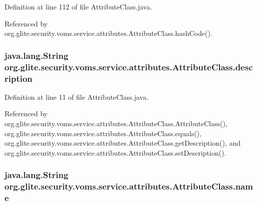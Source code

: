Definition at line 112 of file AttributeClass.java.



Referenced by org.glite.security.voms.service.attributes.AttributeClass.hashCode().

\hypertarget{classorg_1_1glite_1_1security_1_1voms_1_1service_1_1attributes_1_1AttributeClass_a801f19a4afcc37f43430a6e4f56e8cff}{
\subsubsection[{description}]{\setlength{\rightskip}{0pt plus 5cm}java.lang.String {\bf org.glite.security.voms.service.attributes.AttributeClass.description}}}
\label{classorg_1_1glite_1_1security_1_1voms_1_1service_1_1attributes_1_1AttributeClass_a801f19a4afcc37f43430a6e4f56e8cff}


Definition at line 11 of file AttributeClass.java.



Referenced by org.glite.security.voms.service.attributes.AttributeClass.AttributeClass(), org.glite.security.voms.service.attributes.AttributeClass.equals(), org.glite.security.voms.service.attributes.AttributeClass.getDescription(), and org.glite.security.voms.service.attributes.AttributeClass.setDescription().

\hypertarget{classorg_1_1glite_1_1security_1_1voms_1_1service_1_1attributes_1_1AttributeClass_a82b753e3485022060f07c71a2060d8e6}{
\subsubsection[{name}]{\setlength{\rightskip}{0pt plus 5cm}java.lang.String {\bf org.glite.security.voms.service.attributes.AttributeClass.name}}}
\label{classorg_1_1glite_1_1security_1_1voms_1_1service_1_1attributes_1_1AttributeClass_a82b753e3485022060f07c71a2060d8e6}


